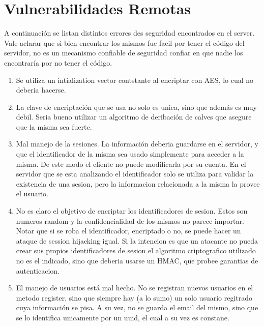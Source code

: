\documentclass[11pt, a4paper, twoside]{article}
\begin{document}
%
%
\clearpage
{}
\section{Vulnerabilidades Remotas}

A continuación se listan distintos errores des seguridad encontrados en el server. Vale aclarar que si bien encontrar los mismos fue facil por tener el código del servidor, no es un mecanismo confiable de seguridad confiar en que nadie los encontraría por no tener el código.

\begin{enumerate}

\item Se utiliza un intialization vector contstante al encriptar con AES, lo cual no deberia hacerse.

\item La clave de encriptación que se usa no solo es unica, sino que además es muy debil. Seria bueno utilizar un algoritmo de deribación de calves que asegure que la misma sea fuerte.

\item Mal manejo de la sesiones. La información deberia guardarse en el servidor, y que el identificador de la misma sea usado simplemente para acceder a la misma. De este modo el cliente no puede modificarla por su cuenta. En el servidor que se esta analizando el identificador solo se utiliza para validar la existencia de una sesion, pero la informacion relacionada a la misma la provee el usuario.

\item No es claro el objetivo de encriptar los identificadores de sesion. Estos son numeros random y la confidencialidad de los mismos no parece importar. Notar que si se roba el identificador, encriptado o no, se puede hacer un ataque de session hijacking igual. Si la intencion es que un atacante no pueda crear sus propios identificadores de sesion el algoritmo criptografico utilizado no es el indicado, sino que deberia usarse un HMAC, que probee garantias de autenticacion.

\item El manejo de usuarios está mal hecho. No se registran nuevos usuarios en el metodo register, sino que siempre hay (a lo sumo) un solo usuario regitrado cuya información se pisa. A su vez, no se guarda el email del mismo, sino que se lo identifica unicamente por un uuid, el cual a su vez es constane.


\end{enumerate}
\end{document}
